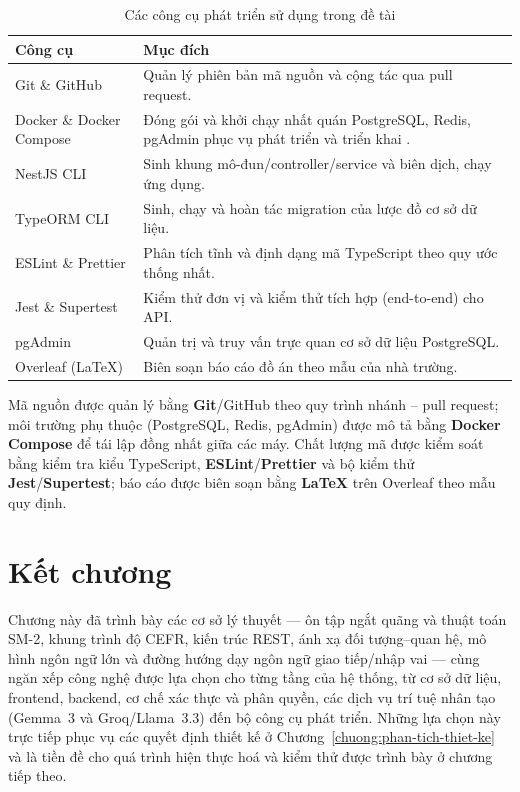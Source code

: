\begin{table}[h]
  \centering
  \small
  \renewcommand{\arraystretch}{1.3}
  \begin{tabular}{|p{4.0cm}|p{10.6cm}|}
    \hline
    \textbf{Công cụ} & \textbf{Mục đích} \\
    \hline
    Git \& GitHub & Quản lý phiên bản mã nguồn và cộng tác qua pull request. \\
    \hline
    Docker \& Docker Compose & Đóng gói và khởi chạy nhất quán PostgreSQL, Redis, pgAdmin phục vụ phát triển và triển khai \cite{docker2024}. \\
    \hline
    NestJS CLI & Sinh khung mô-đun/controller/service và biên dịch, chạy ứng dụng. \\
    \hline
    TypeORM CLI & Sinh, chạy và hoàn tác migration của lược đồ cơ sở dữ liệu. \\
    \hline
    ESLint \& Prettier & Phân tích tĩnh và định dạng mã TypeScript theo quy ước thống nhất. \\
    \hline
    Jest \& Supertest & Kiểm thử đơn vị và kiểm thử tích hợp (end-to-end) cho API. \\
    \hline
    pgAdmin & Quản trị và truy vấn trực quan cơ sở dữ liệu PostgreSQL. \\
    \hline
    Overleaf (\LaTeX) & Biên soạn báo cáo đồ án theo mẫu của nhà trường. \\
    \hline
  \end{tabular}
  \caption{Các công cụ phát triển sử dụng trong đề tài}
  \label{tab:dev-tools}
\end{table}

Mã nguồn được quản lý bằng \textbf{Git}/GitHub theo quy trình nhánh -- pull
request; môi trường phụ thuộc (PostgreSQL, Redis, pgAdmin) được mô tả bằng
\textbf{Docker Compose} \cite{docker2024} để tái lập đồng nhất giữa các máy.
Chất lượng mã được kiểm soát bằng kiểm tra kiểu TypeScript,
\textbf{ESLint}/\textbf{Prettier} và bộ kiểm thử \textbf{Jest}/\textbf{Supertest};
báo cáo được biên soạn bằng \textbf{\LaTeX} trên Overleaf theo mẫu quy định.

\section{Kết chương}
\label{sec:ket-chuong-3}

Chương này đã trình bày các cơ sở lý thuyết --- ôn tập ngắt quãng và thuật
toán SM-2, khung trình độ CEFR, kiến trúc REST, ánh xạ đối tượng--quan hệ,
mô hình ngôn ngữ lớn và đường hướng dạy ngôn ngữ giao tiếp/nhập vai --- cùng
ngăn xếp công nghệ được lựa chọn cho từng tầng của hệ thống, từ cơ sở dữ liệu,
frontend, backend, cơ chế xác thực và phân quyền, các dịch vụ trí tuệ nhân tạo
(Gemma~3 và Groq/Llama~3.3) đến bộ công cụ phát triển. Những lựa
chọn này trực tiếp phục vụ các quyết định thiết kế ở
Chương~\ref{chuong:phan-tich-thiet-ke} và là tiền đề cho quá trình hiện
thực hoá và kiểm thử được trình bày ở chương tiếp theo.
